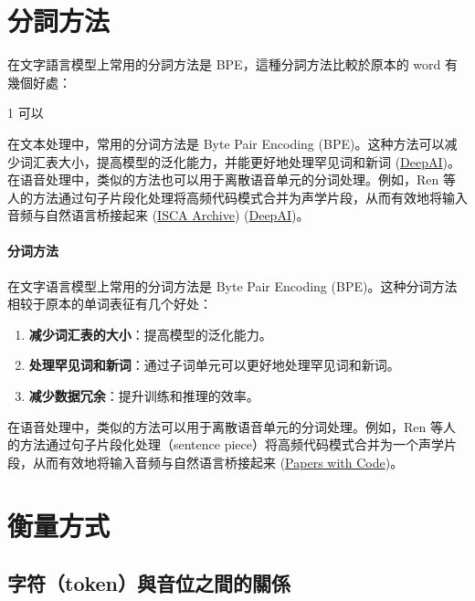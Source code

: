 


\section{分詞方法}


在文字語言模型上常用的分詞方法是 BPE，這種分詞方法比較於原本的 word 有幾個好處：

1 可以


 在文本处理中，常用的分词方法是 Byte Pair Encoding (BPE)。这种方法可以减少词汇表大小，提高模型的泛化能力，并能更好地处理罕见词和新词 (\href{https://deepai.org/publication/speech-pre-training-with-acoustic-piece}{DeepAI})。在语音处理中，类似的方法也可以用于离散语音单元的分词处理。例如，Ren 等人的方法通过句子片段化处理将高频代码模式合并为声学片段，从而有效地将输入音频与自然语言桥接起来 (\href{https://www.isca-archive.org/interspeech_2022/ren22_interspeech.html}{ISCA Archive}) (\href{https://deepai.org/publication/speech-pre-training-with-acoustic-piece}{DeepAI})。 


\paragraph{分词方法}

在文字语言模型上常用的分词方法是 Byte Pair Encoding (BPE)。这种分词方法相较于原本的单词表征有几个好处：

\begin{enumerate}
    \item \textbf{减少词汇表的大小}：提高模型的泛化能力。
    \item \textbf{处理罕见词和新词}：通过子词单元可以更好地处理罕见词和新词。
    \item \textbf{减少数据冗余}：提升训练和推理的效率。
\end{enumerate}
在语音处理中，类似的方法可以用于离散语音单元的分词处理。例如，Ren 等人的方法通过句子片段化处理（sentence piece）将高频代码模式合并为一个声学片段，从而有效地将输入音频与自然语言桥接起来 (\href{https://paperswithcode.com/paper/speech-pre-training-with-acoustic-piece}{Papers with Code})。

 


 

\section{衡量方式}

\subsection{字符（token）與音位之間的關係}




